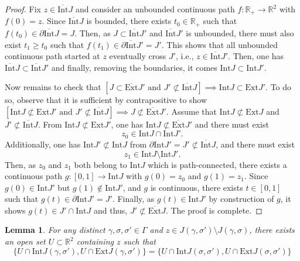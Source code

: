 \documentclass[a4paper, 11pt]{article} %
\theoremstyle{plain}
\newtheorem{lemma}[theorem]{Lemma}
\newcommand{\Int}{\mathrm{Int}}
\newcommand{\clInt}{\overline{\mathrm{Int}}}
\newcommand{\Ext}{\mathrm{Ext}}
\newcommand{\clExt}{\overline{\mathrm{Ext}}}
\newcommand{\R}{\mathbb{R}}
\newcommand{\1}{\mathds 1}
\numberwithin{equation}{section}
\begin{document}
\begin{proof}
    Fix $z\in\clInt J$ and consider an unbounded continuous path $f:\R_+\to\R^2$ with $f(0)=z$. Since $\clInt J$ is bounded, there exists $t_0\in\R_+$ such that $f(t_0)\in\partial\clInt J=J$. Then, as $J\subset\clInt J'$ and $\clInt J'$ is unbounded, there must also exist $t_1\geq t_0$ such that $f(t_1)\in\partial\clInt J'=J'$. This shows that all unbounded continuous path started at $z$ eventually cross $J'$, i.e., $z\in\clInt J'$. Then, one has $\clInt J\subset\clInt J'$ and finally, removing the boundaries, it comes $\Int J\subset\Int J'$.
    
    Now remains to check that $[J\subset\clExt J'\text{ and }J'\not\subset\clInt J]\implies\Int J\subset\Ext J'$. To do so, observe that it is sufficient by contrapositive to show $[\Int J\not\subset\Ext J'\text{ and }J'\not\subset\clInt J]\implies J\not\subset\clExt J'$. Assume that $\Int J\not\subset\Ext J$ and $J'\not\subset\clInt J$. From $\Int J\not\subset\Ext J'$, one has $\Int J\not\subset\clExt J'$ and there must exist
        \[z_0\in\Int J\cap\Int J'.\]
    Additionally, one has $\Int J'\not\subset\Int J$ from $\partial\Int J'=J'\not\subset\clInt J$, and there must exist
        \[z_1\in\Int J\setminus\Int J'.\]
    Then, as $z_0$ and $z_1$ both belong to $\Int J$ which is path-connected, there exists a continuous path $g:[0,1]\to\Int J$ with $g(0)=z_0$ and $g(1)=z_1$. Since $g(0)\in\Int J'$ but $g(1)\notin\Int J'$, and $g$ is continuous, there exists $t\in[0,1]$ such that $g(t)\in\partial\Int J'=J'$. Finally, as $g(t)\in\Int J'$ by construction of $g$, it shows $g(t)\in J'\cap\Int J$ and thus, $J'\not\subset\clExt J$. The proof is complete.
\end{proof}


\begin{lemma}
    \label{lemma_local_identification}
    For any distinct $\gamma,\sigma,\sigma'\in\Gamma$ and $z\in J(\gamma,\sigma')\setminus J(\gamma,\sigma)$, there exists an open set $U\subset\R^2$ containing $z$ such that
        \[\{U\cap\Int J(\gamma,\sigma'), U\cap\Ext J(\gamma,\sigma')\}=\{U\cap\Int J(\sigma,\sigma'), U\cap\Ext J(\sigma,\sigma')\}\]
\end{lemma}
\end{document}
